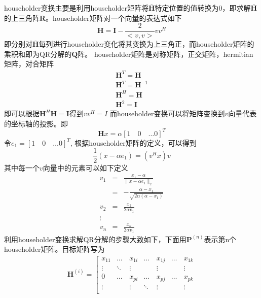 \documentclass[bachelor,nocolorlinks, printoneside]{seuthesis} %
\begin{document}
\begin{Main}
householder变换主要是利用householder矩阵将$\overline{\mathbf{H}}$特定位置的值转换为0，即求解$\overline{\mathbf{H}}$的上三角阵$\mathbf{R}$。householder矩阵对一个向量的表达式如下
\begin{equation}\label{key}
\mathbf{H} = \mathbf{I} - \frac{2}{<v,v>} v v^H
\end{equation}
即分别对$\overline{\mathbf{H}}$每列进行householder变化将其变换为上三角正，而householder矩阵的乘积和即为QR分解的$\mathbf{Q}$阵。
householder矩阵是对称矩阵，正交矩阵，hermitian矩阵，对合矩阵
\begin{gather}\label{key}
\mathbf{H}^T = \mathbf{H}  \nonumber \\
\mathbf{H}^T = \mathbf{H}^{-1}  \nonumber\\
\mathbf{H}^H = \mathbf{H}  \nonumber\\
\mathbf{H}^2 = \mathbf{I} \nonumber
\end{gather}
即可以根据$\mathbf{H}^H\mathbf{H}=\mathbf{I}$得到$vv^H =I$
而householder变换可以将矩阵变换到$v$向量代表的坐标轴的投影。即
\begin{equation}\label{key}
\mathbf{H}x =\alpha [1 \quad 0 \quad \ldots 0]^T
\end{equation}
令$e_1=[1 \quad 0 \quad \ldots 0]^T$,
根据householder矩阵的定义，可以得到
\begin{equation}\label{key}
\frac{1}{2}(x-\alpha e_1)=(v^Hx)v
\end{equation}
其中每一个$v$向量中的元素可以如下定义
\begin{eqnarray}\label{key}
v_1 & = & \frac{x_1-\alpha}{\| x - \alpha e_1 \|_2} \nonumber \\
& = & -\frac{\alpha-x_1}{\sqrt{2\alpha(\alpha-x_1)}} \nonumber \\
v_2 & = & \frac{x_2}{2\alpha v_1} \nonumber  \\
\vdots \nonumber \\
v_n & = & \frac{x_n}{2\alpha v_1}
\end{eqnarray}
利用householder变换求解QR分解的步骤大致如下，下面用$\mathbf{P}^{(n)}$表示第n个householder矩阵。目标矩阵写为
\begin{eqnarray}\label{key}
\mathbf{H}^{(i)} =
\left[
\begin{array}{ccccccc}
x_{11} & \ldots & x_{1i} & \ldots & x_{1j} & \ldots & x_{1k} \\
\vdots & \ddots & \vdots & \quad & \vdots & \quad & \vdots \\
0 & \ldots & x_{pi} & \ldots & x_{pj} & \ldots & x_{pk} \\
\vdots & \quad & \vdots & \ddots & \vdots & \quad & \vdots \\

\end{array}
\end{eqnarray}
\end{Main}
\end{document}
